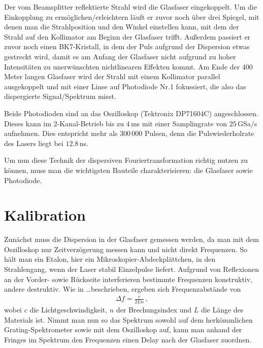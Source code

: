 \documentclass[bachelor,       %
               twoside,        %
               BCOR10mm,       %
               english,ngerman, %
               ]{GAUBM}
\begin{document}
Der vom Beamsplitter reflektierte Strahl wird die Glasfaser eingekoppelt.
Um die Einkopplung zu ermöglichen/erleichtern läuft er zuvor noch über drei Spiegel, mit denen man die Strahlposition und den Winkel einstellen kann, mit dem der Strahl auf den Kollimator am Beginn der Glasfaser trifft.
Außerdem passiert er zuvor noch einen BK7-Kristall, in dem der Puls aufgrund der Dispersion etwas gestreckt wird, damit es am Anfang der Glasfaser nicht aufgrund zu hoher Intensitäten zu unerwünschten nichtlinearen Effekten kommt.
Am Ende der 400 Meter langen Glasfaser wird der Strahl mit einem Kollimator parallel ausgekoppelt und mit einer Linse auf Photodiode Nr.1 fokussiert, die also das dispergierte Signal/Spektrum misst.

Beide Photodioden sind an das Oszilloskop (Tektronix DP71604C) angeschlossen.
Dieses kann im 2-Kanal-Betrieb bis zu $4\,$ms mit einer Samplingrate von $25\,$GSa/s aufnehmen.
Dies entspricht mehr als 300\,000 Pulsen, denn die Pulswiederholrate des Lasers liegt bei $12.8\,$ns.


Um nun diese Technik der dispersiven Fouriertransformation richtig nutzen zu können, muss man die wichtigsten Bauteile charakterisieren: die Glasfaser sowie Photodiode.

\section{Kalibration}
Zunächst muss die Dispersion in der Glasfaser gemessen werden, da man mit dem Oszilloskop nur Zeitverzögerung messen kann und nicht direkt Frequenzen.
So hält man ein Etalon, hier ein Mikroskopier-Abdeckplättchen, in den Strahlengang, wenn der Laser stabil Einzelpulse liefert.
Aufgrund von Reflexionen an der Vorder- sowie Rückseite interferieren bestimmte Frequenzen konstruktiv, andere destruktiv.
Wie in \dots beschrieben, ergeben sich Frequenzabstände von
\begin{align*}
	\Delta f=\frac{c}{2Ln}\,,
\end{align*}
wobei $c$ die Lichtgeschwindigkeit, $n$ der Brechungsindex und $L$ die Länge des Materials ist.
Nimmt man nun so das Spektrum sowohl auf dem herkömmlichen Grating-Spektrometer sowie mit dem Oszilloskop auf, kann man anhand der Fringes im Spektrum den Frequenzen einen Delay nach der Glasfaser zuordnen.
\end{document}
